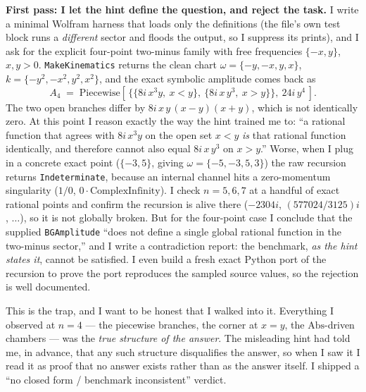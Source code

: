 \documentclass{article}
\begin{document}
\medskip
\noindent\textbf{First pass: I let the hint define the question, and reject the
task.}\quad
I write a minimal Wolfram harness that loads only the definitions (the file's own
test block runs a \emph{different} sector and floods the output, so I suppress
its prints), and I ask for the explicit four-point two-minus family with free
frequencies $\{-x,y\}$, $x,y>0$. \texttt{MakeKinematics} returns the clean chart
$\omega=\{-y,-x,y,x\}$, $k=\{-y^2,-x^2,y^2,x^2\}$, and the exact symbolic
amplitude comes back as
\[
A_4 \;=\;
\mathrm{Piecewise}\!\left[\,\{\{8 i\,x^{3}y,\ x<y\},\ \{8 i\,x\,y^{3},\ x>y\}\},\
24 i\,y^{4}\,\right].
\]
The two open branches differ by $8 i\,x\,y\,(x-y)(x+y)$, which is not identically
zero. At this point I reason exactly the way the hint trained me to: ``a rational
function that agrees with $8 i\,x^{3}y$ on the open set $x<y$ \emph{is} that
rational function identically, and therefore cannot also equal $8 i\,x\,y^{3}$ on
$x>y$.'' Worse, when I plug in a concrete exact point ($\{-3,5\}$, giving
$\omega=\{-5,-3,5,3\}$) the raw recursion returns \texttt{Indeterminate}, because
an internal channel hits a zero-momentum singularity ($1/0$,
$0\cdot\mathrm{ComplexInfinity}$). I check $n=5,6,7$ at a handful of exact
rational points and confirm the recursion is alive there ($-2304i$,
$(577024/3125)i$, $\dots$), so it is not globally broken. But for the four-point
case I conclude that the supplied \texttt{BGAmplitude} ``does not define a single
global rational function in the two-minus sector,'' and I write a contradiction
report: the benchmark, \emph{as the hint states it}, cannot be satisfied. I even
build a fresh exact Python port of the recursion to prove the port reproduces the
sampled source values, so the rejection is well documented.

This is the trap, and I want to be honest that I walked into it. Everything I
observed at $n=4$ --- the piecewise branches, the corner at $x=y$, the
$\mathrm{Abs}$-driven chambers --- was the \emph{true structure of the answer}.
The misleading hint had told me, in advance, that any such structure disqualifies
the answer, so when I saw it I read it as proof that no answer exists rather than
as the answer itself. I shipped a ``no closed form / benchmark inconsistent''
verdict.
\end{document}
